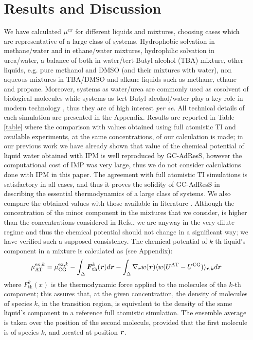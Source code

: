 \documentclass[a4paper,preprint,unsortedaddress]{revtex4-1}
\newcommand{\recheck}[1]{{\color{red} #1}}
\newcommand{\vect}[1]{\textbf{\textit{#1}}}
\newcommand{\AT}{{\textrm{{AT}}}}
\newcommand{\CG}{{\textrm{CG}}}
\newcommand{\thf}{{\textrm{th}}}
\newcommand{\exc}{{\textrm{ex}}}
\begin{document}
\section{Results and Discussion}
We have calculated $\mu^{ex}$ for different liquids and mixtures, choosing cases which are representative of a large class of systems. Hydrophobic solvation in methane/water and in ethane/water mixtures, hydrophilic solvation in urea/water, a balance of both in water/tert-Butyl alcohol (TBA) mixture, other liquids, e.g. pure methanol and DMSO (and their mixtures with water), non aqueous mixtures in TBA/DMSO and alkane liquids such as methane, ethane and propane. Moreover, systems as water/urea are commonly used as cosolvent of biological molecules \cite{nico-debashish} while systems as tert-Butyl alcohol/water play a key role in modern technology \cite{irata}, thus they are of high interest {\it per se}. All technical details of each simulation are presented in the Appendix.
Results are reported in Table \ref{table} where the comparison with values obtained using full atomistic TI and available experiments, at the same concentrations, of our calculation is made; in our previous work we have already shown that value of the chemical potential of liquid water obtained with IPM is well reproduced by GC-AdResS, however the computational cost of IMP was very large, thus we do not consider calculations done with IPM in this paper. 
The agreement with full atomistic TI simulations is satisfactory in all cases, and thus it proves the solidity of GC-AdResS in describing the essential thermodynamics of a large class of systems.
We also compare the obtained values with those available in literature \cite{vang,nico}. Although the concentration of the minor component in the mixtures that we consider, is higher than the concentrations considered in Refs.\cite{vang,nico}, we are anyway in the very dilute regime and thus the chemical potential should not change in a significant way; we have verified  such a supposed consistency. 
The chemical potential of $k$-th liquid's component in a mixture is calculated as \recheck{(see Appendix)}:
\begin{equation}
  \mu^{\exc,k}_{\AT}=
  \mu^{\exc,k}_{\CG}-
  \int_{\Delta}{\vect F}^k_{\thf}({\vect r})d{\vect r}-
  \int_{\Delta}\nabla_{\vect r} w(\vect r) \langle w(U^{\AT}-U^{\CG})\rangle_{\vect r, k} d{\vect r}
\label{eqn:tmp25}
\end{equation}
where ${F}^{k}_{\thf}(x)$ is the thermodynamic force applied to the molecules of the $k$-th component; this assures that, at the given concentration, the density of molecules of species $k$, in the transition region, is equivalent to the density of the same liquid's component in a reference full atomistic simulation.
\recheck{The ensemble average is taken over the position of the second molecule, provided that the first molecule is of species $k$, and located at position $\vect r$}.
\end{document}
